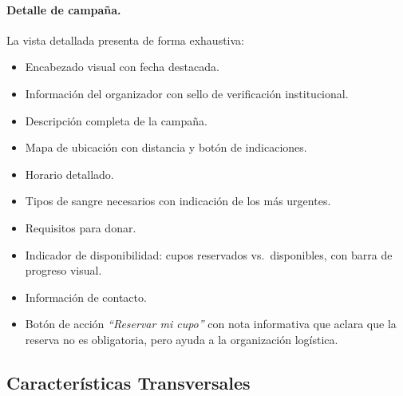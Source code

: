 \documentclass[12pt, a4paper]{article}
\begin{document}
\paragraph{Detalle de campaña.}
La vista detallada presenta de forma exhaustiva:
\begin{itemize}
    \item Encabezado visual con fecha destacada.
    \item Información del organizador con sello de verificación institucional.
    \item Descripción completa de la campaña.
    \item Mapa de ubicación con distancia y botón de indicaciones.
    \item Horario detallado.
    \item Tipos de sangre necesarios con indicación de los más urgentes.
    \item Requisitos para donar.
    \item Indicador de disponibilidad: cupos reservados vs.\ disponibles, con barra de progreso visual.
    \item Información de contacto.
    \item Botón de acción \textit{``Reservar mi cupo''} con nota informativa que aclara que la reserva no es obligatoria, pero ayuda a la organización logística.
\end{itemize}

\subsection{Características Transversales}
\end{document}
